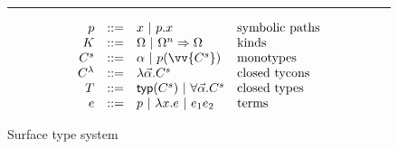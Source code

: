 \begin{figure}
\hrule

\[
\begin{array}{rcll}
p & ::= & x~|~p.x  & \textrm{symbolic paths}\\
K & ::= & \Omega~|~\Omega^n \Rightarrow \Omega & \textrm{kinds} \\
C^s & ::= & \alpha~|~p(\vv{C^s}) & \textrm{monotypes}\\
C^\lambda & ::= & \lambda\vec{\alpha}.C^s & \textrm{closed tycons}\\
T & ::= &
\mathsf{typ}(C^s)~|~\forall\vec{\alpha}.C^s & \textrm{closed types} \\
e & ::= & p~|~\lambda x.e~|~e_1 e_2 & \textrm{terms}
\end{array}
\]

\caption{Surface type system}
\label{fig:typesystem}
\end{figure}
